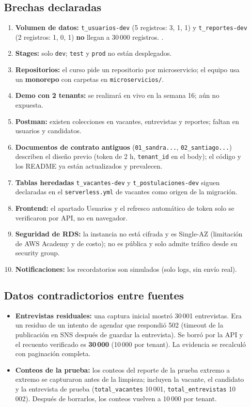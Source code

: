 \subsection{Brechas declaradas}
\begin{enumerate}
\item \textbf{Volumen de datos:} \texttt{t\_usuarios-dev} (5 registros: 3, 1, 1) y \texttt{t\_reportes-dev} (2 registros: 1, 0, 1) \textbf{no} llegan a 30\,000 registros. \nocumple.
\item \textbf{Stages:} solo \texttt{dev}; \texttt{test} y \texttt{prod} no están desplegados.
\item \textbf{Repositorios:} el curso pide un repositorio por microservicio; el equipo usa un \textbf{monorepo} con carpetas en \texttt{microservicios/}.
\item \textbf{Demo con 2 tenants:} se realizará en vivo en la semana 16; aún no expuesta.
\item \textbf{Postman:} existen colecciones en vacantes, entrevistas y reportes; faltan en usuarios y candidatos.
\item \textbf{Documentos de contrato antiguos} (\texttt{01\_sandra...}, \texttt{02\_santiago...}) describen el diseño previo (token de 2 h, \texttt{tenant\_id} en el body); el código y los README ya están actualizados y prevalecen.
\item \textbf{Tablas heredadas} \texttt{t\_vacantes-dev} y \texttt{t\_postulaciones-dev} siguen declaradas en el \texttt{serverless.yml} de vacantes como origen de la migración.
\item \textbf{Frontend:} el apartado Usuarios y el refresco automático de token solo se verificaron por API, no en navegador.
\item \textbf{Seguridad de RDS:} la instancia no está cifrada y es Single-AZ (limitación de AWS Academy y de costo); no es pública y solo admite tráfico desde su security group.
\item \textbf{Notificaciones:} los recordatorios son simulados (solo logs, sin envío real).
\end{enumerate}

\subsection{Datos contradictorios entre fuentes}\label{sec:contradicciones}
\begin{itemize}
\item \textbf{Entrevistas residuales:} una captura inicial mostró 30\,001 entrevistas. Era un residuo de un intento de agendar que respondió 502 (timeout de la publicación en SNS después de guardar la entrevista). Se borró por la API y el recuento verificado es \textbf{30\,000} (10\,000 por tenant). La evidencia  se recalculó con paginación completa.
\item \textbf{Conteos de la prueba:} los conteos del reporte de la prueba extremo a extremo se capturaron antes de la limpieza; incluyen la vacante, el candidato y la entrevista de prueba (\texttt{total\_vacantes} 10\,001, \texttt{total\_entrevistas} 10\,002). Después de borrarlos, los conteos vuelven a 10\,000 por tenant.
\end{itemize}

